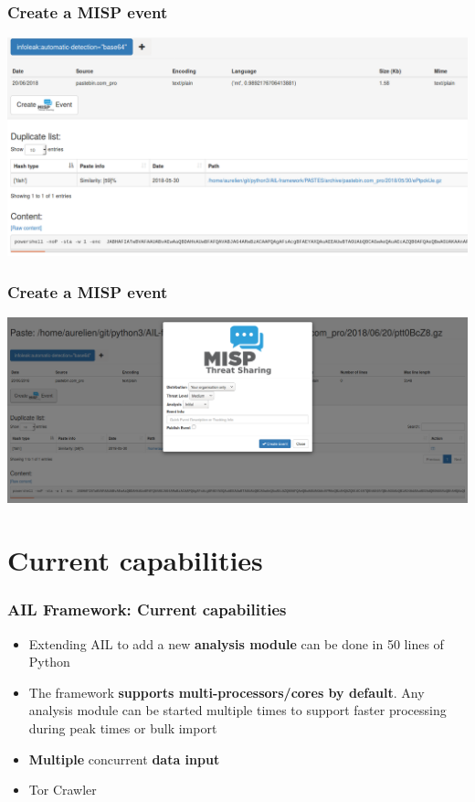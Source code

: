\documentclass{beamer}
\begin{document}
\begin{frame}
    \frametitle{Create a MISP event}
    \centerline{\includegraphics[scale=0.25]{screenshot/create-event-base64.png}}
\end{frame}

\begin{frame}
    \frametitle{Create a MISP event}
    \centerline{\includegraphics[scale=0.25]{screenshot/create-misp-event-base64.png}}
\end{frame}


\section{Current capabilities}

\begin{frame}
    \frametitle{AIL Framework: Current capabilities}
    \begin{itemize}
        \item Extending AIL to add a new {\bf analysis module} can be done in 50 lines of Python
        \item The framework {\bf supports multi-processors/cores by default}. Any analysis module can be started multiple times to support faster processing during peak times or bulk import
        \item \textbf{Multiple} concurrent \textbf{data input}
        \item Tor Crawler
    \end{itemize}
\end{frame}
\end{document}
